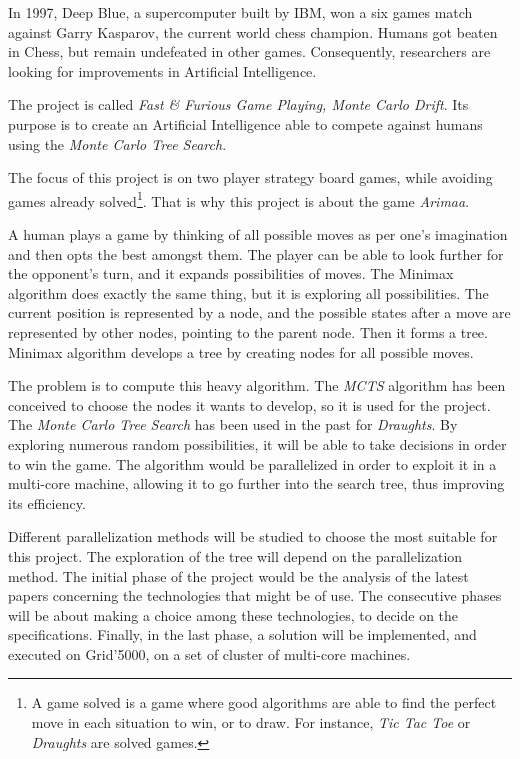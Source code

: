 
In 1997, Deep Blue, a supercomputer built by IBM, won a six games match against Garry Kasparov, the current world chess champion. Humans got beaten in Chess, but remain undefeated in other games. Consequently, researchers are looking for improvements in Artificial Intelligence.
\newline

The project is called \emph{Fast \& Furious Game Playing, Monte Carlo Drift}. Its purpose is to create an Artificial Intelligence able to compete against humans using the \emph{Monte Carlo Tree Search}.
\newline

The focus of this project is on two player strategy board games, while avoiding games already solved\footnote{A game solved is a game where good algorithms are able to find the perfect move in each situation to win, or to draw. For instance, \textit{Tic Tac Toe} or \textit{Draughts} are solved games.}. That is why this project is about the game \emph{Arimaa}.
\newline

A human plays a game by thinking of all possible moves as per one's imagination and then opts the best amongst them. The player can be able to look further for the opponent's turn, and it expands possibilities of moves. The Minimax algorithm does exactly the same thing, but it is exploring all possibilities. The current position is represented by a node, and the possible states after a move are represented by other nodes, pointing to the parent node. Then it forms a tree.
Minimax algorithm develops a tree by creating nodes for all possible moves.
\newline

The problem is to compute this heavy algorithm. The \emph{MCTS} algorithm has been conceived to choose  the nodes it wants to develop, so it is used for the project.
The \emph{Monte Carlo Tree Search} has been used in the past for \textit{Draughts}. By exploring numerous random possibilities, it will be able to take decisions in order to win the game.
The algorithm would be parallelized in order to exploit it in a multi-core machine, allowing it to go further into the search tree, thus improving its efficiency.
\newline

Different parallelization methods will be studied to choose the most suitable for this project.
The exploration of the tree will depend on the parallelization method.
The initial phase of the project would be the analysis of the latest papers concerning the technologies that might be of use.
The consecutive phases will be about making a choice among these technologies, to decide on the specifications.
Finally, in the last phase, a solution will be implemented, and executed on Grid'5000, on a set of cluster of multi-core machines.
\newline

